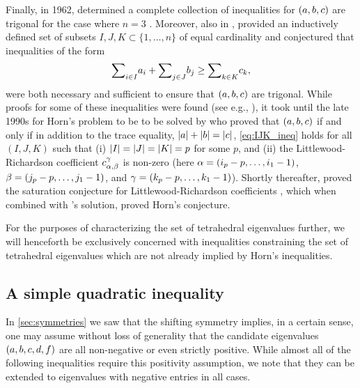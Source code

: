 \documentclass[notitlepage, 10pt]{article}
\begin{document}
Finally, in 1962, \citeauthor{horn1962eigenvalues} determined a complete collection of inequalities for $(a,b,c)$ are trigonal for the case where $n=3$ \cite{horn1962eigenvalues}.
Moreover, also in \cite{horn1962eigenvalues}, \citeauthor{horn1962eigenvalues} provided an inductively defined set of subsets $I,J,K \subset \{1,\ldots, n\}$ of equal cardinality and conjectured that inequalities of the form
\begin{equation}
    \label{eq:IJK_ineq}
    {\sum}_{i\in I} a_i + {\sum}_{j\in J} b_j \geq {\sum}_{k\in K} c_{k},
\end{equation}
were both necessary and sufficient to ensure that $(a,b,c)$ are trigonal.
While proofs for some of these inequalities were found (see e.g., \cite{thompson1971eigenvalues,thompson1970eigenvalues}), it took until the late 1990s for Horn's problem to be to be solved by \citeauthor{klyachko1998stable} \cite{klyachko1998stable} who proved that $(a,b,c)$ if and only if in addition to the trace equality, $\left|a\right| + \left|b\right| = \left|c\right|$, \cref{eq:IJK_ineq} holds for all $(I,J,K)$ such that (i) $\left|I\right| = \left|J\right| = \left|K\right| = p$ for some $p$, and (ii) the Littlewood-Richardson coefficient $c^{\gamma}_{\alpha,\beta}$ is non-zero (here $\alpha = (i_p - p, \ldots, i_1 - 1)$, $\beta = (j_p - p, \ldots, j_1 - 1)$, and $\gamma = (k_p - p, \ldots, k_1 - 1)$).
Shortly thereafter, \citeauthor{knutson1999honeycomb} proved the saturation conjecture for Littlewood-Richardson coefficients \cite{knutson1999honeycomb}, which when combined with \citeauthor{klyachko1998stable}'s solution, proved Horn's conjecture.

For the purposes of characterizing the set of tetrahedral eigenvalues further, we will henceforth be exclusively concerned with inequalities constraining the set of tetrahedral eigenvalues which are not already implied by Horn's inequalities.

\subsection{A simple quadratic inequality}

In \cref{sec:symmetries} we saw that the shifting symmetry implies, in a certain sense, one may assume without loss of generality that the candidate eigenvalues $(a,b,c,d,f)$ are all non-negative or even strictly positive.
While almost all of the following inequalities require this positivity assumption, we note that they can be extended to eigenvalues with negative entries in all cases.
\end{document}
